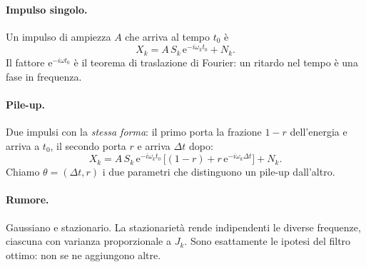 \documentclass[11pt,a4paper]{article}
\newcommand{\e}{\mathrm{e}}
\newcommand{\dt}{\Delta t}
\begin{document}
\paragraph{Impulso singolo.} Un impulso di ampiezza $A$ che arriva al tempo $t_0$ è
\begin{equation}
  X_k = A\, S_k\, \e^{-i\omega_k t_0} + N_k .
\end{equation}
Il fattore $\e^{-i\omega t_0}$ è il teorema di traslazione di Fourier: un ritardo nel tempo è una
fase in frequenza.

\paragraph{Pile-up.} Due impulsi con la \emph{stessa forma}: il primo porta la frazione $1-r$
dell'energia e arriva a $t_0$, il secondo porta $r$ e arriva $\dt$ dopo:
\begin{equation}
  X_k = A\, S_k\, \e^{-i\omega_k t_0}\,\Big[(1-r) + r\, \e^{-i\omega_k \dt}\Big] + N_k .
  \label{eq:pileup}
\end{equation}
Chiamo $\theta = (\dt, r)$ i due parametri che distinguono un pile-up dall'altro.

\paragraph{Rumore.} Gaussiano e stazionario. La stazionarietà rende indipendenti le diverse
frequenze, ciascuna con varianza proporzionale a $J_k$. Sono esattamente le ipotesi del filtro
ottimo: non se ne aggiungono altre.
\end{document}
